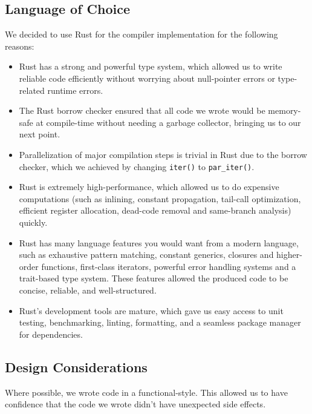 \documentclass{article}
\begin{document}
        \subsection*{Language of Choice}
        We decided to use Rust for the compiler implementation for the following reasons:
        \begin{itemize}
            \item Rust has a strong and powerful type system, which allowed us to write reliable code efficiently without worrying about null-pointer errors or type-related runtime errors.
            \item The Rust borrow checker ensured that all code we wrote would be memory-safe at compile-time without needing a garbage collector, bringing us to our next point.
            \item Parallelization of major compilation steps is trivial in Rust due to the borrow checker, which we achieved by changing \texttt{iter()} to \texttt{par_iter()}.
            \item Rust is extremely high-performance, which allowed us to do expensive computations (such as inlining, constant propagation, tail-call optimization, efficient register allocation, dead-code removal and same-branch analysis) quickly.
            \item Rust has many language features you would want from a modern language, such as exhaustive pattern matching, constant generics, closures and higher-order functions, first-class iterators, powerful error handling systems and a trait-based type system. These features allowed the produced code to be concise, reliable, and well-structured.
            \item Rust's development tools are mature, which gave us easy access to unit testing, benchmarking, linting, formatting, and a seamless package manager for dependencies.
        \end{itemize}
        \subsection*{Design Considerations}
        Where possible, we wrote code in a functional-style. This allowed us to have confidence that the code we wrote didn't have unexpected side effects.
\end{document}
